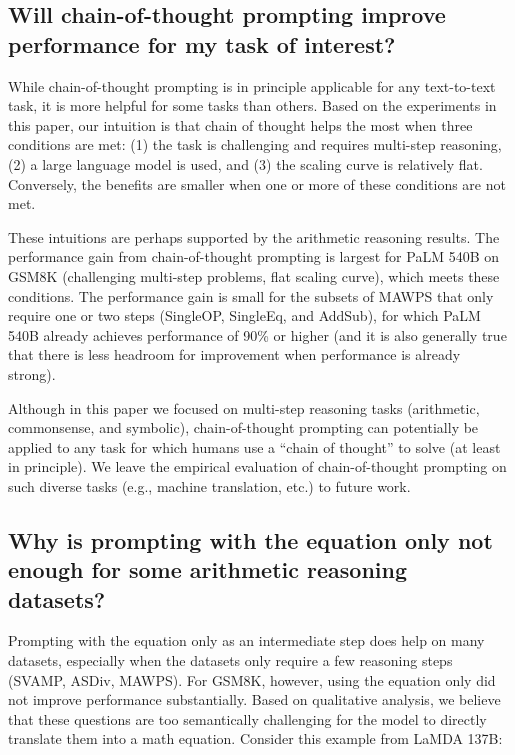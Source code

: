 \documentclass[]{article}
\theoremstyle{plain}
\theoremstyle{definition}
\theoremstyle{remark}
\newcommand{\orange}[1]{#1}
\newcommand{\lamda}[0]{LaMDA}
\newcommand{\palm}[0]{PaLM}
\begin{document}
\subsection{Will chain-of-thought prompting improve performance for my task of interest?}

While chain-of-thought prompting is in principle applicable for any text-to-text task, it is more helpful for some tasks than others.
Based on the experiments in this paper, our intuition is that chain of thought helps the most when three conditions are met: (1) the task is challenging and requires multi-step reasoning, (2) a large language model is used, and (3) the scaling curve is relatively flat.
Conversely, the benefits are smaller when one or more of these conditions are not met.

These intuitions are perhaps supported by the arithmetic reasoning results.
The performance gain from chain-of-thought prompting is largest for \palm{} 540B on GSM8K (challenging multi-step problems, flat scaling curve), which meets these conditions.
The performance gain is small for the subsets of MAWPS that only require one or two steps (SingleOP, SingleEq, and AddSub), for which \palm{} 540B already achieves performance of 90\% or higher (and it is also generally true that there is less headroom for improvement when performance is already strong).

\orange{Although in this paper we focused on multi-step reasoning tasks (arithmetic, commonsense, and symbolic), chain-of-thought prompting can potentially be applied to any task for which humans use a ``chain of thought'' to solve (at least in principle). 
We leave the empirical evaluation of chain-of-thought prompting on such diverse tasks (e.g., machine translation, etc.) to future work.}



\subsection{Why is prompting with the equation only not enough for some arithmetic reasoning datasets?}

Prompting with the equation only as an intermediate step does help on many datasets, especially when the datasets only require a few reasoning steps (SVAMP, ASDiv, MAWPS). For GSM8K, however, using the equation only did not improve performance substantially. Based on qualitative analysis, we believe that these questions are too semantically challenging for the model to directly translate them into a math equation. Consider this example from \lamda{} 137B:
\end{document}
